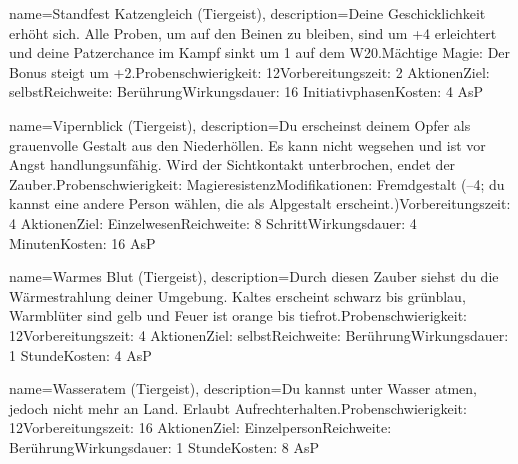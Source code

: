 {
    name={Standfest Katzengleich (Tiergeist)},
    description={Deine Geschicklichkeit erhöht sich. Alle Proben, um auf den Beinen zu bleiben, sind um +4 erleichtert und deine Patzerchance im Kampf sinkt um 1 auf dem W20.\newline Mächtige Magie: Der Bonus steigt um +2.\newline Probenschwierigkeit: 12\newline Vorbereitungszeit: 2 Aktionen\newline Ziel: selbst\newline Reichweite: Berührung\newline Wirkungsdauer: 16 Initiativphasen\newline Kosten: 4 AsP}
}


{
    name={Vipernblick (Tiergeist)},
    description={Du erscheinst deinem Opfer als grauenvolle Gestalt aus den Niederhöllen. Es kann nicht wegsehen und ist vor Angst handlungsunfähig. Wird der Sichtkontakt unterbrochen, endet der Zauber.\newline Probenschwierigkeit: Magieresistenz\newline Modifikationen: Fremdgestalt (–4; du kannst eine andere Person wählen, die als Alpgestalt erscheint.)\newline Vorbereitungszeit: 4 Aktionen\newline Ziel: Einzelwesen\newline Reichweite: 8 Schritt\newline Wirkungsdauer: 4 Minuten\newline Kosten: 16 AsP}
}


{
    name={Warmes Blut (Tiergeist)},
    description={Durch diesen Zauber siehst du die Wärmestrahlung deiner Umgebung. Kaltes erscheint schwarz bis grünblau, Warmblüter sind gelb und Feuer ist orange bis tiefrot.\newline Probenschwierigkeit: 12\newline Vorbereitungszeit: 4 Aktionen\newline Ziel: selbst\newline Reichweite: Berührung\newline Wirkungsdauer: 1 Stunde\newline Kosten: 4 AsP}
}


{
    name={Wasseratem (Tiergeist)},
    description={Du kannst unter Wasser atmen, jedoch nicht mehr an Land. Erlaubt Aufrechterhalten.\newline Probenschwierigkeit: 12\newline Vorbereitungszeit: 16 Aktionen\newline Ziel: Einzelperson\newline Reichweite: Berührung\newline Wirkungsdauer: 1 Stunde\newline Kosten: 8 AsP}
}


